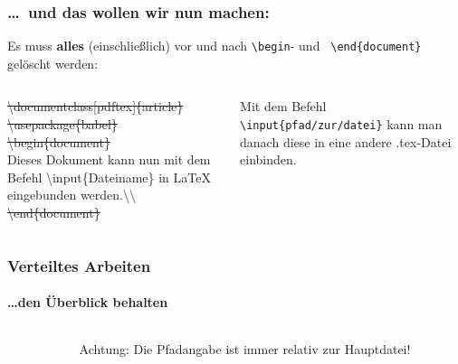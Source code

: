 
\begin{frame}
\frametitle{\ldots ~und das wollen wir nun machen:}
\hspace{-5mm}
Es muss \textbf{alles} (einschlie\ss lich) vor und nach \texttt{\color{unibablueI}\textbackslash begin}\color{black}- 
und \texttt{\color{unibablueI}~\textbackslash end\color{black}\{document\}} gel\"oscht werden:\\[5mm]
\begin{columns}
\begin{column}{.60\textwidth}
\sout{\color{nounibaredI}\color{nounibaredI}\textbackslash documentclass\color{black}\color{nounibagreenI}[pdftex]\color{black}\{article\}\\
\color{nounibaredI}\textbackslash usepackage\color{black}\{babel\}\\
\color{nounibaredI}\color{unibablueI}\textbackslash\color{unibablueI}begin\color{black}\color{black}\{document\} }\\
Dieses Dokument kann nun mit dem Befehl \color{nounibaredI}\color{nounibaredI}\textbackslash input\color{nounibaredI}\color{black}\{Dateiname\} in LaTeX eingebunden werden.\color{nounibaredI}\color{nounibaredI}\textbackslash \color{nounibaredI}\textbackslash \color{black}  \\
\sout{\color{nounibaredI}\color{unibablueI}\textbackslash\color{unibablueI}end\color{black}\color{black}\{document\} }
\end{column}
\begin{column}{.37\textwidth}
Mit dem Befehl \texttt{\color{nounibaredI}\textbackslash input\color{black}\{pfad/zur/datei\}} kann man danach
 diese in eine andere {\ttfamily .tex}-Datei einbinden.

\end{column}
\end{columns}
\end{frame}


\begin{frame}
\frametitle{Verteiltes Arbeiten}
\framesubtitle{\ldots den \"Uberblick behalten}
\begin{columns}
\begin{column}{.6\textwidth}
\end{column}
\begin{column}{.3\textwidth}
\begin{alertblock}{Achtung:}
Die Pfadangabe ist immer relativ zur Hauptdatei!
\end{alertblock}
\end{column}
\end{columns}

\end{frame}


